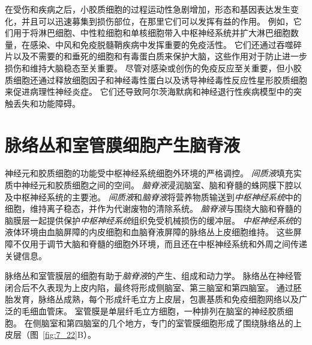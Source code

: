 在受伤和疾病之后，小胶质细胞的过程运动性急剧增加，形态和基因表达发生变化，并且可以迅速募集到损伤部位，在那里它们可以发挥有益的作用。
例如，它们用于将淋巴细胞、中性粒细胞和单核细胞带入中枢神经系统并扩大淋巴细胞数量，在感染、中风和免疫脱髓鞘疾病中发挥重要的免疫活性。
它们还通过吞噬碎片以及不需要的和垂死的细胞和有毒蛋白质来保护大脑，这些作用对于防止进一步损伤和维持大脑稳态至关重要。
尽管对感染或创伤的免疫反应至关重要，但小胶质细胞还通过释放细胞因子和神经毒性蛋白以及诱导神经毒性反应性星形胶质细胞来促进病理性神经炎症。
它们还导致阿尔茨海默病和神经退行性疾病模型中的突触丢失和功能障碍。


\section{脉络丛和室管膜细胞产生脑脊液}

神经元和胶质细胞的功能受中枢神经系统细胞外环境的严格调控。
\textit{间质液}填充实质中神经元和胶质细胞之间的空间。
\textit{脑脊液}浸润脑室、脑和脊髓的蛛网膜下腔以及中枢神经系统的主要池。
\textit{间质液}和\textit{脑脊液}将营养物质输送到\textit{中枢神经系统}中的细胞，维持离子稳态，并作为代谢废物的清除系统。
\textit{脑脊液}与围绕大脑和脊髓的脑膜层一起提供保护\textit{中枢神经系统}组织免受机械损伤的缓冲层。
\textit{中枢神经系统}的液体环境由血脑屏障的内皮细胞和血脑脊液屏障的脉络丛上皮细胞维持。
这些屏障不仅用于调节大脑和脊髓的细胞外环境，而且还在中枢神经系统和外周之间传递关键信息。


脉络丛和室管膜层的细胞有助于\textit{脑脊液}的产生、组成和动力学。
脉络丛在神经管闭合后不久表现为上皮内陷，最终将形成侧脑室、第三脑室和第四脑室。
通过胚胎发育，脉络丛成熟，每个形成纤毛立方上皮层，包裹基质和免疫细胞网络以及广泛的毛细血管床。
室管膜是单层纤毛立方细胞，一种排列在脑室的神经胶质细胞。
在侧脑室和第四脑室的几个地方，专门的室管膜细胞形成了围绕脉络丛的上皮层（图~\ref{fig:7_22}B）。



